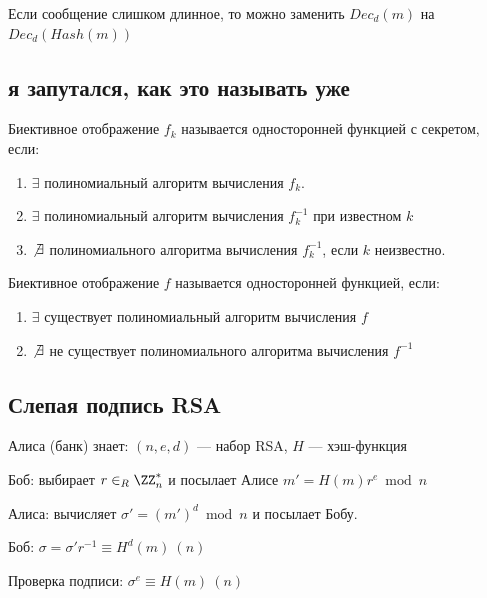 Если сообщение слишком длинное, то можно заменить \( Dec_d(m) \) на \( Dec_d(Hash(m)) \)

\subsection{я запутался, как это называть уже}

\begin{defn}{}{}
    Биективное отображение \( f_k \) называется односторонней функцией
    с секретом, если:
    \begin{enumerate}
        \item
            \( \exists \) полиномиальный алгоритм вычисления \( f_k \).
        \item
            \( \exists \) полиномиальный алгоритм вычисления \( f_k^{-1} \) при известном \( k \)
        \item
            \( \not\exists \) полиномиального алгоритма вычисления \( f_k^{-1} \),
            если \( k \) неизвестно.
    \end{enumerate}
\end{defn}

\begin{defn}{}{}
    Биективное отображение \( f \) называется односторонней функцией,
    если:
    \begin{enumerate}
        \item
            \( \exists \) существует полиномиальный алгоритм вычисления \( f \)
        \item
            \( \not\exists \) не существует полиномиального алгоритма вычисления \( f^{-1} \)
    \end{enumerate}
\end{defn}

\subsection{Слепая подпись RSA}

Алиса (банк) знает: \( (n, e, d) \) --- набор RSA, \( H \) --- хэш-функция

Боб: выбирает \( r \in_R \ZZ_n^* \) и посылает Алисе \( m' = H(m) r^e \bmod n \)

Алиса: вычисляет \( \sigma' = (m')^d \bmod n \) и посылает Бобу.

Боб: \( \sigma = \sigma' r^{-1} \equiv  H^d (m) \: (n) \)

Проверка подписи: \( \sigma^e \equiv H(m) \: (n) \)

\newpage

